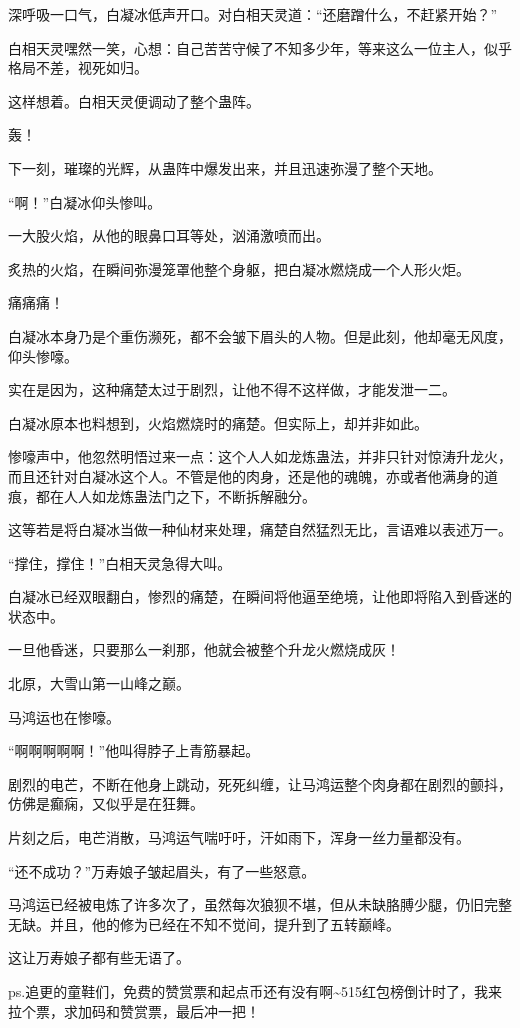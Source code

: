 \begin{this_body}
深呼吸一口气，白凝冰低声开口。对白相天灵道：“还磨蹭什么，不赶紧开始？”

白相天灵嘿然一笑，心想：自己苦苦守候了不知多少年，等来这么一位主人，似乎格局不差，视死如归。

这样想着。白相天灵便调动了整个蛊阵。

轰！

下一刻，璀璨的光辉，从蛊阵中爆发出来，并且迅速弥漫了整个天地。

“啊！”白凝冰仰头惨叫。

一大股火焰，从他的眼鼻口耳等处，汹涌激喷而出。

炙热的火焰，在瞬间弥漫笼罩他整个身躯，把白凝冰燃烧成一个人形火炬。

痛痛痛！

白凝冰本身乃是个重伤濒死，都不会皱下眉头的人物。但是此刻，他却毫无风度，仰头惨嚎。

实在是因为，这种痛楚太过于剧烈，让他不得不这样做，才能发泄一二。

白凝冰原本也料想到，火焰燃烧时的痛楚。但实际上，却并非如此。

惨嚎声中，他忽然明悟过来一点：这个人人如龙炼蛊法，并非只针对惊涛升龙火，而且还针对白凝冰这个人。不管是他的肉身，还是他的魂魄，亦或者他满身的道痕，都在人人如龙炼蛊法门之下，不断拆解融分。

这等若是将白凝冰当做一种仙材来处理，痛楚自然猛烈无比，言语难以表述万一。

“撑住，撑住！”白相天灵急得大叫。

白凝冰已经双眼翻白，惨烈的痛楚，在瞬间将他逼至绝境，让他即将陷入到昏迷的状态中。

一旦他昏迷，只要那么一刹那，他就会被整个升龙火燃烧成灰！

北原，大雪山第一山峰之巅。

马鸿运也在惨嚎。

“啊啊啊啊啊！”他叫得脖子上青筋暴起。

剧烈的电芒，不断在他身上跳动，死死纠缠，让马鸿运整个肉身都在剧烈的颤抖，仿佛是癫痫，又似乎是在狂舞。

片刻之后，电芒消散，马鸿运气喘吁吁，汗如雨下，浑身一丝力量都没有。

“还不成功？”万寿娘子皱起眉头，有了一些怒意。

马鸿运已经被电炼了许多次了，虽然每次狼狈不堪，但从未缺胳膊少腿，仍旧完整无缺。并且，他的修为已经在不知不觉间，提升到了五转巅峰。

这让万寿娘子都有些无语了。

ps.追更的童鞋们，免费的赞赏票和起点币还有没有啊\~{}515红包榜倒计时了，我来拉个票，求加码和赞赏票，最后冲一把！

\end{this_body}

